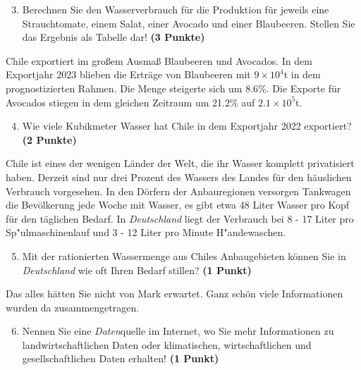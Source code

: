 \documentclass[a4paper, 9pt]{scrartcl}\usepackage[]{graphicx}\usepackage[]{xcolor}
\begin{document}
\begin{enumerate}
  \setcounter{enumi}{2}
\item Berechnen Sie den Wasserverbrauch für die Produktion für jeweils eine Strauchtomate, einem Salat, einer Avocado und einer Blaubeeren. Stellen Sie das Ergebnis als Tabelle dar! \textbf{(3 Punkte)}
\end{enumerate}

Chile exportiert im großem Ausmaß Blaubeeren und Avocados. In dem Exportjahr 2023 blieben die Erträge von Blaubeeren mit \ensuremath{9\times 10^{4}}t in dem prognostizierten Rahmen. Die Menge steigerte sich um 8.6\%. Die Exporte für Avocados stiegen in dem gleichen Zeitraum um 21.2\% auf \ensuremath{2.1\times 10^{5}}t.

\begin{enumerate}
  \setcounter{enumi}{3}
\item Wie viele Kubikmeter Wasser hat Chile in dem Exportjahr 2022 exportiert? \textbf{(2 Punkte)}
\end{enumerate}

Chile ist eines der wenigen Länder der Welt, die ihr Wasser komplett privatisiert haben. Derzeit sind nur drei Prozent des Wassers des Landes für den häuslichen Verbrauch vorgesehen. In den Dörfern der Anbauregionen versorgen Tankwagen die Bevölkerung jede Woche mit Wasser, es gibt etwa 48 Liter Wasser pro Kopf für den täglichen Bedarf. In \textit{Deutschland} liegt der Verbrauch bei 8 - 17 Liter pro Sp{"u}lmaschinenlauf und 3 - 12 Liter pro Minute H{"a}ndewaschen.

\begin{enumerate}
  \setcounter{enumi}{4}
\item Mit der rationierten Wassermenge aus Chiles Anbaugebieten können Sie in \textit{Deutschland} wie oft Ihren Bedarf stillen? \textbf{(1 Punkt)}
\end{enumerate}

Das alles hätten Sie nicht von Mark erwartet. Ganz schön viele Informationen wurden da zusammengetragen.

\begin{enumerate}
  \setcounter{enumi}{5}  
  \item Nennen Sie eine \textit{Daten}quelle im Internet, wo Sie mehr Informationen zu landwirtschaftlichen Daten oder klimatischen, wirtschaftlichen und gesellschaftlichen Daten erhalten! \textbf{(1 Punkt)}
\end{enumerate} 
\clearpage
\end{document}
